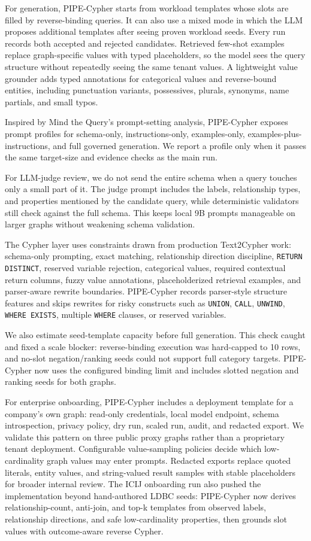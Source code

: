 \documentclass[11pt]{article}
\begin{document}
For generation, PIPE-Cypher starts from workload templates whose slots are filled by reverse-binding queries. It can also use a mixed mode in which the LLM proposes additional templates after seeing proven workload seeds. Every run records both accepted and rejected candidates. Retrieved few-shot examples replace graph-specific values with typed placeholders, so the model sees the query structure without repeatedly seeing the same tenant values. A lightweight value grounder adds typed annotations for categorical values and reverse-bound entities, including punctuation variants, possessives, plurals, synonyms, name partials, and small typos.

Inspired by Mind the Query's prompt-setting analysis, PIPE-Cypher exposes prompt profiles for schema-only, instructions-only, examples-only, examples-plus-instructions, and full governed generation. We report a profile only when it passes the same target-size and evidence checks as the main run.

For LLM-judge review, we do not send the entire schema when a query touches only a small part of it. The judge prompt includes the labels, relationship types, and properties mentioned by the candidate query, while deterministic validators still check against the full schema. This keeps local 9B prompts manageable on larger graphs without weakening schema validation.

The Cypher layer uses constraints drawn from production Text2Cypher work: schema-only prompting, exact matching, relationship direction discipline, \texttt{RETURN DISTINCT}, reserved variable rejection, categorical values, required contextual return columns, fuzzy value annotations, placeholderized retrieval examples, and parser-aware rewrite boundaries. PIPE-Cypher records parser-style structure features and skips rewrites for risky constructs such as \texttt{UNION}, \texttt{CALL}, \texttt{UNWIND}, \texttt{WHERE EXISTS}, multiple \texttt{WHERE} clauses, or reserved variables.

We also estimate seed-template capacity before full generation. This check caught and fixed a scale blocker: reverse-binding execution was hard-capped to 10 rows, and no-slot negation/ranking seeds could not support full category targets. PIPE-Cypher now uses the configured binding limit and includes slotted negation and ranking seeds for both graphs.

For enterprise onboarding, PIPE-Cypher includes a deployment template for a company's own graph: read-only credentials, local model endpoint, schema introspection, privacy policy, dry run, scaled run, audit, and redacted export. We validate this pattern on three public proxy graphs rather than a proprietary tenant deployment. Configurable value-sampling policies decide which low-cardinality graph values may enter prompts. Redacted exports replace quoted literals, entity values, and string-valued result samples with stable placeholders for broader internal review. The ICIJ onboarding run also pushed the implementation beyond hand-authored LDBC seeds: PIPE-Cypher now derives relationship-count, anti-join, and top-k templates from observed labels, relationship directions, and safe low-cardinality properties, then grounds slot values with outcome-aware reverse Cypher.
\end{document}
